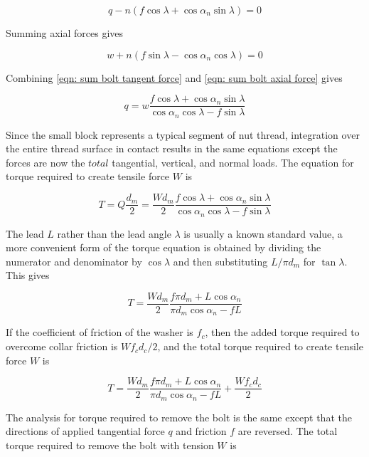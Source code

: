\documentclass[
10pt,
a4paper,
openany,
svgnames,
]{book}
\begin{document}
\begin{equation} \label{eqn: sum bolt tangent force}
  q - n(f\cos \lambda  + \cos \alpha_n\sin \lambda ) = 0
\end{equation}

Summing axial forces gives

\begin{equation} \label{eqn: sum bolt axial force}
  w + n(f\sin \lambda  - \cos \alpha_n\cos \lambda ) = 0
\end{equation}

Combining \cref{eqn: sum bolt tangent force} and \cref{eqn: sum bolt axial force} gives

\[q = w\frac{f\cos \lambda + \cos \alpha_n\sin \lambda }{\cos \alpha_n\cos \lambda  - f\sin \lambda }\]

Since the small block represents a typical segment of nut thread, integration over the entire thread surface in contact results in the same equations except the forces are now the $total$ tangential, vertical, and normal loads. The equation for torque required to create tensile force $W$ is

\begin{equation}
  T = Q\frac{d_m}{2} = \frac{Wd_m}{2}\frac{f\cos \lambda + \cos \alpha_n\sin \lambda }{\cos \alpha_n\cos \lambda - f\sin \lambda }
\end{equation}

The lead $L$ rather than the lead angle $\lambda$ is usually a known standard value, a more convenient form of the torque equation is obtained by dividing the numerator and denominator by $\cos \lambda$ and then substituting $L/\pi d_m$ for $\tan \lambda$. This gives

\[T = \frac{Wd_m}{2}\frac{f\pi d_m + L\cos \alpha_n}{\pi d_m\cos \alpha_n - fL}\]

If the coefficient of friction of the washer is $f_c$, then the added torque required to overcome collar friction is $Wf_cd_c/2$, and the total torque required to create tensile force $W$ is

\begin{equation} \label{eqn: required bolt tightening torque}
  T = \frac{Wd_m}{2}\frac{f\pi d_m + L\cos \alpha_n}{\pi d_m\cos \alpha_n - fL} + \frac{Wf_cd_c}{2}
\end{equation}

The analysis for torque required to remove the bolt is the same except that the directions of applied tangential force $q$ and friction $f$ are reversed. The total torque required to remove the bolt with tension $W$ is
\end{document}
